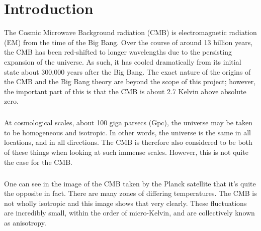 \documentclass[twoside, fontsize=12pt,
     bibliography=totoc, %
     listof=totoc, %
     index=totoc, %
     onehalfspacing %
]{_MScDiss2017_cls}
\begin{document}
\newpage%
\cleardoublepage
{}%


\chapter{Introduction}
The Cosmic Microwave Background radiation (CMB) is electromagnetic radiation (EM) from the time of the Big Bang. Over the course of around 13 billion years, the CMB has been red-shifted to longer wavelengths due to the persisting expansion of the universe. As such, it has cooled dramatically from its initial state about 300,000 years after the Big Bang. The exact nature of the origins of the CMB and the Big Bang theory are beyond the scope of this project; however, the important part of this is that the CMB is about 2.7 Kelvin above absolute zero. \cite{UCLA}

\paragraph{}

At cosmological scales, about 100 giga parsecs (Gpc), the universe may be taken to be homogeneous and isotropic. In other words, the universe is the same in all locations, and in all directions. The CMB is therefore also considered to be both of these things when looking at such immense scales. However, this is not quite the case for the CMB.

\paragraph{}

One can see in the image of the CMB taken by the Planck satellite that it's quite the opposite in fact. There are many zones of differing temperatures. The CMB is not wholly isotropic and this image shows that very clearly. These fluctuations are incredibly small, within the order of micro-Kelvin, and are collectively known as anisotropy.

\paragraph{}
\end{document}

